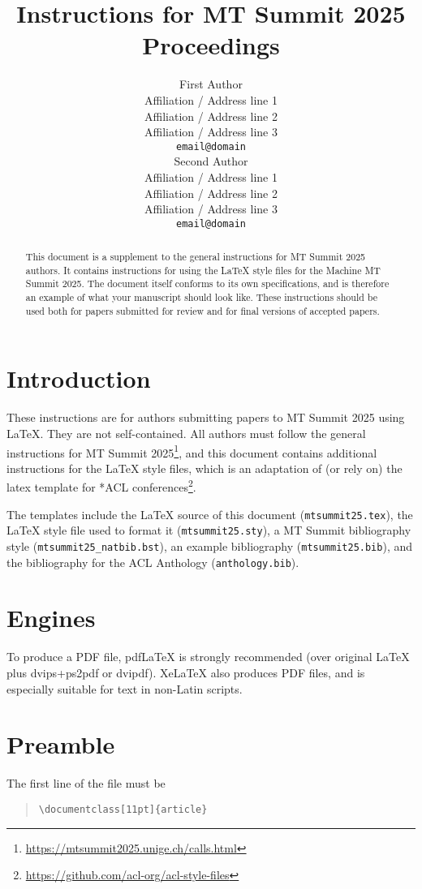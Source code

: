 \documentclass[11pt]{article}
\title{Instructions for MT Summit 2025 Proceedings}
\author{First Author \\
  Affiliation / Address line 1 \\
  Affiliation / Address line 2 \\
  Affiliation / Address line 3 \\
  \texttt{email@domain} \\\And
  Second Author \\
  Affiliation / Address line 1 \\
  Affiliation / Address line 2 \\
  Affiliation / Address line 3 \\
  \texttt{email@domain} \\}
\begin{document}
\maketitle
\begin{abstract}
This document is a supplement to the general instructions for MT Summit 2025 authors. It contains instructions for using the \LaTeX{} style files for the Machine MT Summit 2025.
The document itself conforms to its own specifications, and is therefore an example of what your manuscript should look like.
These instructions should be used both for papers submitted for review and for final versions of accepted papers.
\end{abstract}

\section{Introduction}

These instructions are for authors submitting papers to MT Summit 2025 using \LaTeX. They are not self-contained. All authors must follow the general instructions for MT Summit 2025\footnote{\url{https://mtsummit2025.unige.ch/calls.html}}, and this document contains additional instructions for the \LaTeX{} style files, which is an adaptation of (or rely on) the latex template for *ACL conferences\footnote{\url{https://github.com/acl-org/acl-style-files}}.

The templates include the \LaTeX{} source of this document (\texttt{mtsummit25.tex}),
the \LaTeX{} style file used to format it (\texttt{mtsummit25.sty}),
a MT Summit bibliography style (\texttt{mtsummit25\_natbib.bst}),
an example bibliography (\texttt{mtsummit25.bib}), and the bibliography for the ACL Anthology (\texttt{anthology.bib}).

\section{Engines}

To produce a PDF file, pdf\LaTeX{} is strongly recommended (over original \LaTeX{} plus dvips+ps2pdf or dvipdf). Xe\LaTeX{} also produces PDF files, and is especially suitable for text in non-Latin scripts.

\section{Preamble}

The first line of the file must be
\begin{quote}
\begin{verbatim}
\documentclass[11pt]{article}
\end{verbatim}
\end{quote}
\end{document}

